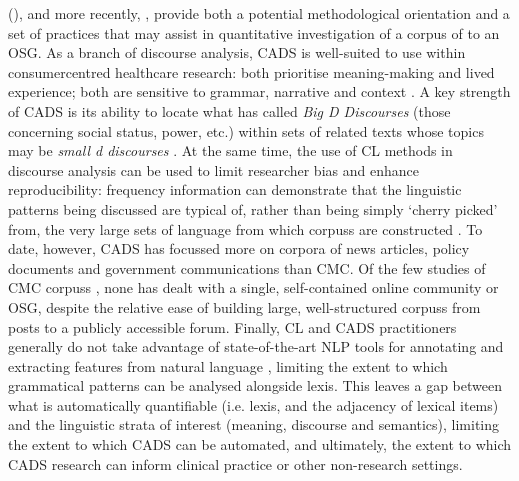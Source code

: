  (), and more recently, , provide both a potential methodological orientation and a set of practices that may assist in quantitative investigation of a \gls{corpus} of  to an \gls{OSG}. As a branch of discourse analysis, \gls{CADS} is well\hyp{}suited to use within \gls{consumercentred} healthcare research: both prioritise meaning\hyp{}making and lived experience; both are sensitive to grammar, narrative and context \cite{crawford_language_2013,partington_corpora_2004}. A key strength of \gls{CADS} is its ability to locate what \textcite{gee_social_2007} has called \emph{Big D Discourses} (those concerning social status, power, etc.) within sets of related texts whose topics may be \emph{small d discourses} \cite[about particular things and events in the world; see][]{baker_corpora_2013}. At the same time, the use of \gls{CL} methods in discourse analysis can be used to limit researcher bias and enhance reproducibility: frequency information can demonstrate that the linguistic patterns being discussed are typical of, rather than being simply `cherry picked' from, the very large sets of language from which \glspl{corpus} are constructed \cite{baker_acceptable_2012}. To date, however, \gls{CADS} has focussed more on corpora of news articles, policy documents and government communications than \gls{CMC}. Of the few studies of \gls{CMC} \glspl{corpus} \cite[e.g.][]{harvey_am_2007,harvey_disclosures_2012,prentice_using_2010}, none has dealt with a single, self\hyp{}contained online community or \gls{OSG}, despite the relative ease of building large, well\hyp{}structured \glspl{corpus} from \glspl{post} to a publicly accessible \gls{forum}. Finally, \gls{CL} and \gls{CADS} practitioners generally do not take advantage of state\hyp{}of\hyp{}the\hyp{}art \gls{NLP} tools for annotating and extracting features from natural language \cite{groom_corpora_2015}, limiting the extent to which grammatical patterns can be analysed alongside lexis. This leaves a gap between what is automatically quantifiable (i.e. lexis, and the adjacency of lexical items) and the linguistic strata of interest (meaning, discourse and semantics), limiting the extent to which \gls{CADS} can be automated, and ultimately, the extent to which \gls{CADS} research can inform clinical practice or other non\hyp{}research settings.



